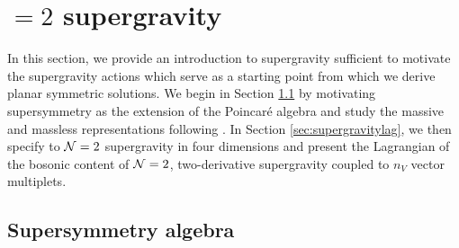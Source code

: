 \section{\titleN$ = 2$ supergravity}
\label{sec:supergravity}

In this section, we provide an introduction to supergravity sufficient to motivate the supergravity actions which serve as a starting point from which we derive planar symmetric solutions. We begin in Section \ref{sec:supersymmetry} by motivating supersymmetry as the extension of the Poincar\'e algebra and study the massive and massless representations following \cite{Wess:1992cp}. In Section \ref{sec:supergravitylag}, we then specify to ${\cal N} = 2$ supergravity in four dimensions and present the Lagrangian of the bosonic content of ${\cal N} = 2$, two-derivative supergravity coupled to $n_V$ vector multiplets. 

\subsection{Supersymmetry algebra}
\label{sec:supersymmetry}

